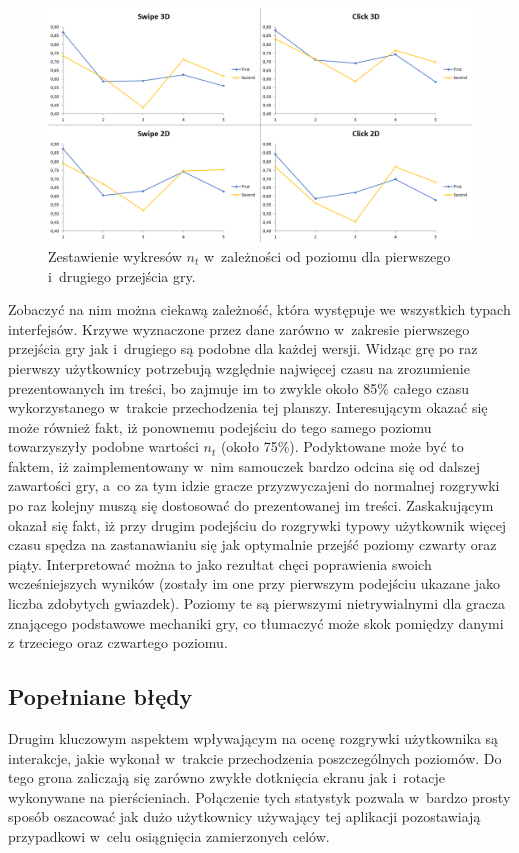 \documentclass[a4paper,12pt,numbers=noenddot]{report}
\begin{document}
\begin{figure}[h!]
	\centering
  	\includegraphics[width=\linewidth]{diag/ref_tThink_tAbs.png}
	\caption{Zestawienie wykresów $n_{t}$ w~zależności od poziomu dla pierwszego i~drugiego przejścia gry.}
	\label{fig:diag:ref:tThink_tAbs}
\end{figure}

Zobaczyć na nim można ciekawą zależność, która występuje we wszystkich typach interfejsów. Krzywe wyznaczone przez dane zarówno w~zakresie pierwszego przejścia gry jak i~drugiego są podobne dla każdej wersji. Widząc grę po raz pierwszy użytkownicy potrzebują względnie najwięcej czasu na zrozumienie prezentowanych im treści, bo zajmuje im to zwykle około 85\% całego czasu wykorzystanego w~trakcie przechodzenia tej planszy. Interesującym okazać się może również fakt, iż ponownemu podejściu do tego samego poziomu towarzyszyły podobne wartości $n_{t}$ (około 75\%). Podyktowane może być to faktem, iż zaimplementowany w~nim samouczek bardzo odcina się od dalszej zawartości gry, a~co za tym idzie gracze przyzwyczajeni do normalnej rozgrywki po raz kolejny muszą się dostosować do prezentowanej im treści.
Zaskakującym okazał się fakt, iż przy drugim podejściu do rozgrywki typowy użytkownik więcej czasu spędza na zastanawianiu się jak optymalnie przejść poziomy czwarty oraz piąty. Interpretować można to jako rezultat chęci poprawienia swoich wcześniejszych wyników (zostały im one przy pierwszym podejściu ukazane jako liczba zdobytych gwiazdek). Poziomy te są pierwszymi nietrywialnymi dla gracza znającego podstawowe mechaniki gry, co tłumaczyć może skok pomiędzy danymi z trzeciego oraz czwartego poziomu. \\

\subsection{Popełniane błędy}
Drugim kluczowym aspektem wpływającym na ocenę rozgrywki użytkownika są interakcje, jakie wykonał w~trakcie przechodzenia poszczególnych poziomów. Do tego grona zaliczają się zarówno zwykłe dotknięcia ekranu jak i~rotacje wykonywane na pierścieniach. Połączenie tych statystyk pozwala w~bardzo prosty sposób oszacować jak dużo użytkownicy używający tej aplikacji pozostawiają przypadkowi w~celu osiągnięcia zamierzonych celów. 
\end{document}
